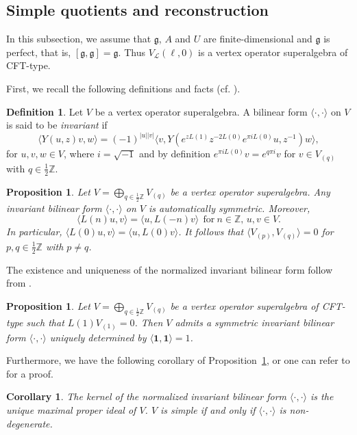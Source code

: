 \documentclass[12pt]{article}
\numberwithin{equation}{section}
\newtheorem{proposition}[theorem]{Proposition}
\newtheorem{corollary}[theorem]{Corollary}
\theoremstyle{definition}
\newtheorem{definition}[theorem]{Definition}
\theoremstyle{plain}
\newcommand{\bZ}{\ensuremath{\mathbb{Z}}}
\newcommand{\fg}{\mathfrak{g}}
\newcommand{\cL}{\ensuremath{\mathcal{L}}}
\newcommand{\bone}{\mathbf{1 }}
\begin{document}
\subsection{Simple quotients and reconstruction}
\hspace{1.5em}In this subsection, we assume that $\fg$, $A$ and $U$ are finite-dimensional and $\fg$ is perfect, that is, $[\fg,\fg]=\fg$. Thus $V_\cL(\ell,0)$ is a vertex operator superalgebra of CFT-type.

First, we recall the following definitions and facts (cf. \cite{DH,FHL,Li94,Sch,Xu}).
\begin{definition}
    Let $V$ be a vertex operator superalgebra. A bilinear form $\langle\cdot,\cdot\rangle$ on $V$ is said to be \emph{invariant} if 
    \begin{equation}\label{invariant}
        \langle Y(u,z)v,w\rangle=(-1)^{|u||v|}\langle v,Y(e^{zL(1)}z^{-2L(0)}e^{\pi iL(0)}u,z^{-1})w\rangle,
    \end{equation}
    for $u,v,w\in V$, where $i=\sqrt{-1}$ and by definition $e^{\pi i L(0)}v=e^{q\pi i}v$ for $v\in V_{(q)}$ with $q\in\frac{1}{2}\bZ$.
\end{definition}

\begin{proposition}\label{prop:symm.invar.bilin.form}
    Let $V=\bigoplus_{q\in\frac{1}{2}\bZ}V_{(q)}$ be a vertex operator superalgebra. Any invariant bilinear form $\langle\cdot,\cdot\rangle$ on $V$ is automatically symmetric. Moreover,
    \begin{equation}\label{involution}
        \langle L(n)u,v\rangle=\langle u,L(-n)v\rangle\ \ \text{for}\ n\in\bZ,\,u,v\in V.
    \end{equation}
    In particular, $\langle L(0)u,v\rangle=\langle u,L(0)v\rangle$. It follows that $\langle V_{(p)},V_{(q)}\rangle=0$ for $p,q\in\frac{1}{2}\bZ$ with $p\neq q$.
\end{proposition}

The existence and uniqueness of the normalized invariant bilinear form follow from \cite{Li94,Sch,Xu}. 
\begin{proposition}\label{prop:bilinear.form}
    Let $V=\bigoplus_{q\in\frac12\bZ}V_{(q)}$ be a vertex operator superalgebra of CFT-type such that $L(1)V_{(1)}=0$. Then $V$ admits a symmetric invariant bilinear form $\langle\cdot,\cdot\rangle$ uniquely determined by $\langle\bone,\bone\rangle=1$. 
\end{proposition}

Furthermore, we have the following corollary of Proposition~\ref{prop:bilinear.form}, or one can refer to \cite{LY} for a proof.
\begin{corollary}\label{cor:simple}
    The kernel of the normalized invariant bilinear form $\langle\cdot,\cdot\rangle$ is the unique maximal proper ideal of $V$. $V$ is simple if and only if $\langle\cdot,\cdot\rangle$ is non-degenerate.
\end{corollary}
\end{document}
